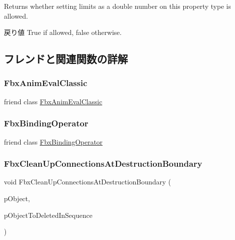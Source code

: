 Returns whether setting limits as a double number on this property type is allowed. \begin{DoxyReturn}{戻り値}
{\ttfamily True} if allowed, {\ttfamily false} otherwise. 
\end{DoxyReturn}


\subsection{フレンドと関連関数の詳解}
\mbox{\label{class_fbx_property_a1b769b6684b71dfe76f350fef1137cab}} 
\subsubsection{\texorpdfstring{Fbx\+Anim\+Eval\+Classic}{FbxAnimEvalClassic}}
{\footnotesize\ttfamily friend class \hyperlink{class_fbx_anim_eval_classic}{Fbx\+Anim\+Eval\+Classic}\hspace{0.3cm}{\ttfamily [friend]}}

\mbox{\label{class_fbx_property_a8d8dceef68317bda5a5d5404edfab5da}} 
\subsubsection{\texorpdfstring{Fbx\+Binding\+Operator}{FbxBindingOperator}}
{\footnotesize\ttfamily friend class \hyperlink{class_fbx_binding_operator}{Fbx\+Binding\+Operator}\hspace{0.3cm}{\ttfamily [friend]}}

\mbox{\label{class_fbx_property_ae1a9835e0187d6623df42de2bde8c29d}} 
\subsubsection{\texorpdfstring{Fbx\+Clean\+Up\+Connections\+At\+Destruction\+Boundary}{FbxCleanUpConnectionsAtDestructionBoundary}}
{\footnotesize\ttfamily void Fbx\+Clean\+Up\+Connections\+At\+Destruction\+Boundary (\begin{DoxyParamCaption}\item[{\hyperlink{class_fbx_scene}{Fbx\+Scene} $\ast$}]{p\+Object,  }\item[{\hyperlink{class_fbx_array}{Fbx\+Array}$<$ \hyperlink{class_fbx_object}{Fbx\+Object} $\ast$$>$ \&}]{p\+Object\+To\+Deleted\+In\+Sequence }\end{DoxyParamCaption})\hspace{0.3cm}{\ttfamily [friend]}}

